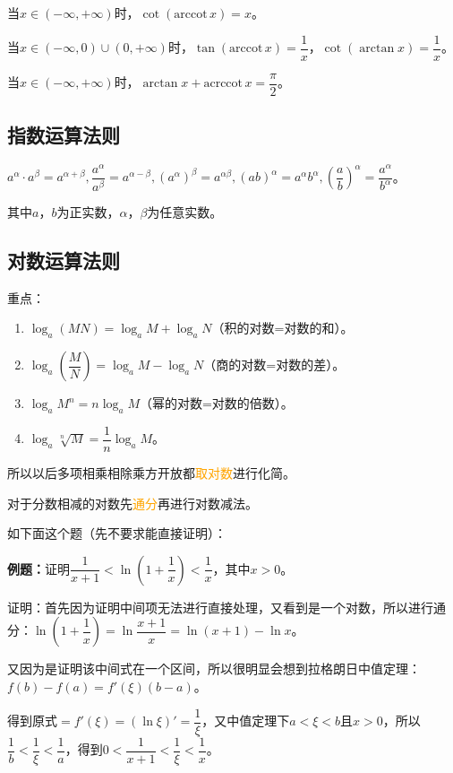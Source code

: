 \documentclass[UTF8, 12pt]{ctexart}
\begin{document}
当$x\in(-\infty,+\infty)$时，$\cot(\textrm{arccot}\,x)=x$。

当$x\in(-\infty,0)\cup(0,+\infty)$时，$\tan(\textrm{arccot}\,x)=\dfrac{1}{x}$，$\cot(\arctan x)=\dfrac{1}{x}$。

当$x\in(-\infty,+\infty)$时，$\arctan x+\textrm{acrccot}\,x=\dfrac{\pi}{2}$。

\subsection{指数运算法则}

$a^\alpha\cdot a^\beta=a^{\alpha+\beta},\dfrac{a^\alpha}{a^\beta}=a^{\alpha-\beta},(a^\alpha)^\beta=a^{\alpha\beta},(ab)^\alpha=a^\alpha b^\alpha,(\dfrac{a}{b})^\alpha=\dfrac{a^\alpha}{b^\alpha}$。

其中$a$，$b$为正实数，$\alpha$，$\beta$为任意实数。

\subsection{对数运算法则}

重点：

\begin{enumerate}
    \item $\log_a(MN)=\log_aM+\log_aN$（积的对数=对数的和）。
    \item $\log_a(\dfrac{M}{N})=\log_aM-\log_aN$（商的对数=对数的差）。
    \item $\log_aM^n=n\log_aM$（幂的对数=对数的倍数）。
    \item $\log_a\sqrt[n]{M}=\dfrac{1}{n}\log_aM$。
\end{enumerate}

所以以后多项相乘相除乘方开放都\textcolor{orange}{取对数}进行化简。

对于分数相减的对数先\textcolor{orange}{通分}再进行对数减法。

如下面这个题（先不要求能直接证明）：

\textbf{例题：}证明$\dfrac{1}{x+1}<\ln(1+\dfrac{1}{x})<\dfrac{1}{x}$，其中$x>0$。

证明：首先因为证明中间项无法进行直接处理，又看到是一个对数，所以进行通分：$\ln(1+\dfrac{1}{x})=\ln\dfrac{x+1}{x}=\ln(x+1)-\ln x$。

又因为是证明该中间式在一个区间，所以很明显会想到拉格朗日中值定理：$f(b)-f(a)=f'(\xi)(b-a)$。

得到原式$=f'(\xi)=(\ln\xi)'=\dfrac{1}{\xi}$，又中值定理下$a<\xi<b$且$x>0$，所以$\dfrac{1}{b}<\dfrac{1}{\xi}<\dfrac{1}{a}$，得到$0<\dfrac{1}{x+1}<\dfrac{1}{\xi}<\dfrac{1}{x}$。
\end{document}

